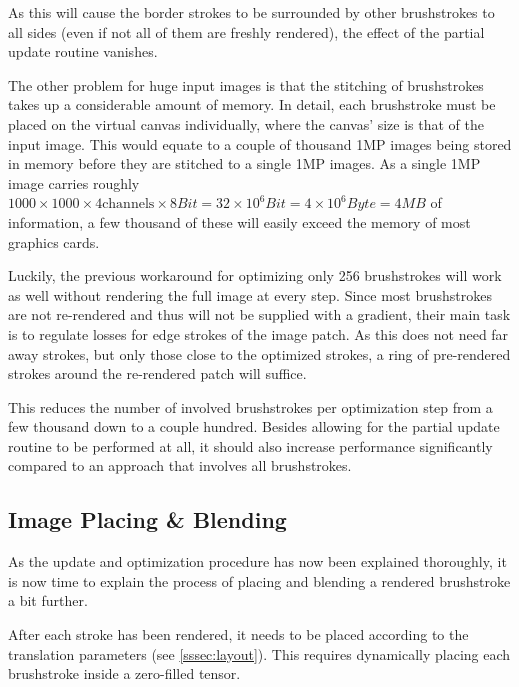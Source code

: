 As this will cause the border strokes to be surrounded by other brushstrokes to all sides (even if not all of them are freshly rendered), the effect of the partial update routine vanishes.

The other problem for huge input images is that the stitching of brushstrokes takes up a considerable amount of memory.
In detail, each brushstroke must be placed on the virtual canvas individually,  where the canvas' size is that of the input image.
This would equate to a couple of thousand 1MP images being stored in memory before they are stitched to a single 1MP images.
As a single 1MP image carries roughly $1000 \times 1000 \times 4 \text{channels} \times 8 Bit = 32 \times 10^{6} Bit = 4 \times 10^{6} Byte = 4 MB$ of information, a few thousand of these will easily exceed the memory of most graphics cards.

Luckily, the previous workaround for optimizing only 256 brushstrokes will work as well without rendering the full image at every step.
Since most brushstrokes are not re-rendered and thus will not be supplied with a gradient, their main task is to regulate losses for edge strokes of the image patch.
As this does not need far away strokes, but only those close to the optimized strokes, a ring of pre-rendered strokes around the re-rendered patch will suffice.

This reduces the number of involved brushstrokes per optimization step from a few thousand down to a couple hundred.
Besides allowing for the partial update routine to be performed at all, it should also increase performance significantly compared to an approach that involves all brushstrokes.

\subsection[Placing \& Blending]{Image Placing \& Blending}
As the update and optimization procedure has now been explained thoroughly, it is now time to explain the process of placing and blending a rendered brushstroke a bit further.

After each stroke has been rendered, it needs to be placed according to the translation parameters (see \ref{sssec:layout}).
This requires dynamically placing each brushstroke inside a zero-filled tensor.

